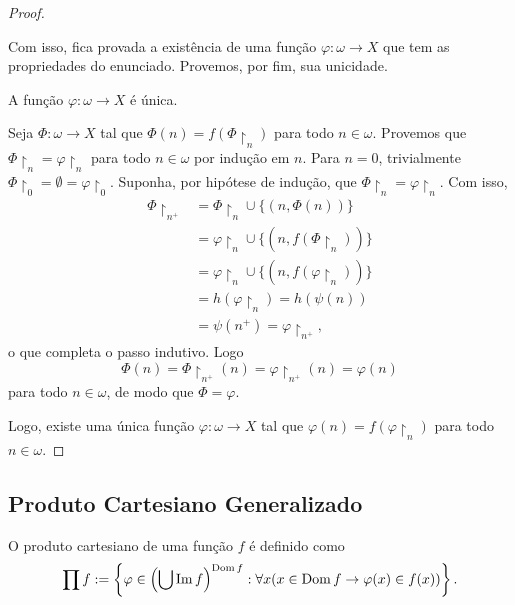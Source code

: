 \begin{proof}
\begin{midproof}
        \end{midproof}
    Com isso, fica provada a existência de uma função $\varphi: \omega \to X$ que tem as propriedades do enunciado. Provemos, por fim, sua unicidade.
        \begin{claim}
            A função $\varphi : \omega \to X$ é única.
        \end{claim}
        \begin{midproof}
            Seja $\Phi : \omega \to X$ tal que $\Phi(n) = f(\Phi \restriction_n)$ para todo $n \in \omega$. Provemos que $\Phi \restriction_n = \varphi \restriction_n$ para todo $n \in \omega$ por indução em $n$. Para $n=0$, trivialmente $\Phi \restriction_{0} = \emptyset = \varphi \restriction_{0}$. Suponha, por hipótese de indução, que $\Phi \restriction_n = \varphi \restriction_n$. Com isso,
                \begin{align*}
                    \Phi \restriction_{n^+} &= \Phi \restriction_n \cup \{ (n, \Phi(n)) \} \\
                    &= \varphi \restriction_n \cup \{ (n, f(\Phi \restriction_n)) \} \\
                    &= \varphi \restriction_n \cup \{ (n, f(\varphi \restriction_n)) \} \\
                    &= h(\varphi \restriction_n) = h(\psi(n)) \\
                    &= \psi(n^+) = \varphi \restriction_{n^+},
                \end{align*}
            o que completa o passo indutivo. Logo
                \[
                    \Phi(n) = \Phi \restriction_{n^+}(n) = \varphi \restriction_{n^+}(n) = \varphi(n)
                \]
            para todo $n \in \omega$, de modo que $\Phi = \varphi$. \whiteproof
        \end{midproof}
    Logo, existe uma única função $\varphi : \omega \to X$ tal que $\varphi(n) = f(\varphi \restriction_n)$ para todo $n \in \omega$. \blackproof
\end{proof}

\subsection{Produto Cartesiano Generalizado}

\begin{definition} \label{defi.set:produtocartesianogeneralizado}
    O produto cartesiano de uma função $f$ é definido como
        \[
            \prod f := \left\{ \varphi \in \left(\bigcup \operatorname{Im} f \right)^{\operatorname{Dom} f} : \forall x (x \in \operatorname{Dom} f \rightarrow \varphi(x) \in f(x)) \right\}.
        \]
\end{definition}

